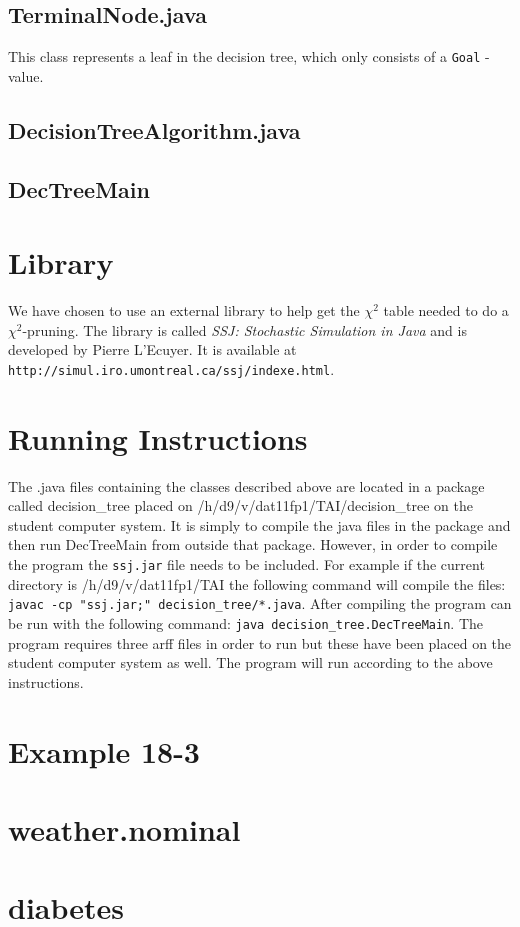 \documentclass[a4paper]{article}
\begin{document}
\subsection{TerminalNode.java}
This class represents a leaf in the decision tree, which only consists of a \texttt{Goal} - value. 
\subsection{DecisionTreeAlgorithm.java}
\subsection{DecTreeMain}

\section{Library}
We have chosen to use an external library to help get the $\chi^{2}$ table needed to do a $\chi^{2}$-pruning. The library is called \emph{SSJ: Stochastic Simulation in Java} and is developed by Pierre L'Ecuyer. It is available at \texttt{http://simul.iro.umontreal.ca/ssj/indexe.html}.


\section{Running Instructions} The .java files containing the classes described
above are located in a package called decision\_tree placed on
/h/d9/v/dat11fp1/TAI/decision\_tree on the student computer system. It
is simply to compile the java files in the package and then run DecTreeMain from
outside that package. However, in order to compile the program the \texttt{ssj.jar} file needs to be included. For example if the current directory is
/h/d9/v/dat11fp1/TAI the following command will compile the files: \texttt{javac -cp "ssj.jar;"
decision\_tree/*.java}. After compiling the program can be run with
the following command: \texttt{java decision\_tree.DecTreeMain}. The program requires three arff files in order to run but these have been placed on the student computer system as well. The program will run according to the above instructions.

\appendix
\section{Example 18-3}
\label{18-3}

\section{weather.nominal}
\label{weather}


\section{diabetes}
\label{diabetes}

\end{document}
